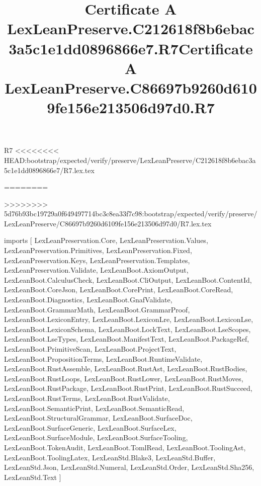 \begin{lexlean}{R7}
<<<<<<<< HEAD:bootstrap/expected/verify/preserve/LexLeanPreserve/C212618f8b6ebac3a5c1e1dd0896866e7/R7.lex.tex
\title{Certificate A LexLeanPreserve.C212618f8b6ebac3a5c1e1dd0896866e7.R7}
========
\title{Certificate A LexLeanPreserve.C86697b9260d6109fe156e213506d97d0.R7}
>>>>>>>> 5d76b93bc19729a0f649497714bc3c8ea33f7c98:bootstrap/expected/verify/preserve/LexLeanPreserve/C86697b9260d6109fe156e213506d97d0/R7.lex.tex
\begin{coremodule}
imports [
  LexLeanPreservation.Core,
  LexLeanPreservation.Values,
  LexLeanPreservation.Primitives,
  LexLeanPreservation.Fixed,
  LexLeanPreservation.Keys,
  LexLeanPreservation.Templates,
  LexLeanPreservation.Validate,
  LexLeanBoot.AxiomOutput,
  LexLeanBoot.CalculusCheck,
  LexLeanBoot.CliOutput,
  LexLeanBoot.ContentId,
  LexLeanBoot.CoreJson,
  LexLeanBoot.CorePrint,
  LexLeanBoot.CoreRead,
  LexLeanBoot.Diagnostics,
  LexLeanBoot.GnafValidate,
  LexLeanBoot.GrammarMath,
  LexLeanBoot.GrammarProof,
  LexLeanBoot.LexiconEntry,
  LexLeanBoot.LexiconLre,
  LexLeanBoot.LexiconLse,
  LexLeanBoot.LexiconSchema,
  LexLeanBoot.LockText,
  LexLeanBoot.LseScopes,
  LexLeanBoot.LseTypes,
  LexLeanBoot.ManifestText,
  LexLeanBoot.PackageRef,
  LexLeanBoot.PrimitiveScan,
  LexLeanBoot.ProjectText,
  LexLeanBoot.PropositionTerms,
  LexLeanBoot.RuntimeValidate,
  LexLeanBoot.RustAssemble,
  LexLeanBoot.RustAst,
  LexLeanBoot.RustBodies,
  LexLeanBoot.RustLoops,
  LexLeanBoot.RustLower,
  LexLeanBoot.RustMoves,
  LexLeanBoot.RustPackage,
  LexLeanBoot.RustPrint,
  LexLeanBoot.RustSucceed,
  LexLeanBoot.RustTerms,
  LexLeanBoot.RustValidate,
  LexLeanBoot.SemanticPrint,
  LexLeanBoot.SemanticRead,
  LexLeanBoot.StructuralGrammar,
  LexLeanBoot.SurfaceDoc,
  LexLeanBoot.SurfaceGeneric,
  LexLeanBoot.SurfaceLex,
  LexLeanBoot.SurfaceModule,
  LexLeanBoot.SurfaceTooling,
  LexLeanBoot.TokenAudit,
  LexLeanBoot.TomlRead,
  LexLeanBoot.ToolingAst,
  LexLeanBoot.ToolingLatex,
  LexLeanStd.Blake3,
  LexLeanStd.Buffer,
  LexLeanStd.Json,
  LexLeanStd.Numeral,
  LexLeanStd.Order,
  LexLeanStd.Sha256,
  LexLeanStd.Text
]


\end{coremodule}
\end{lexlean}
